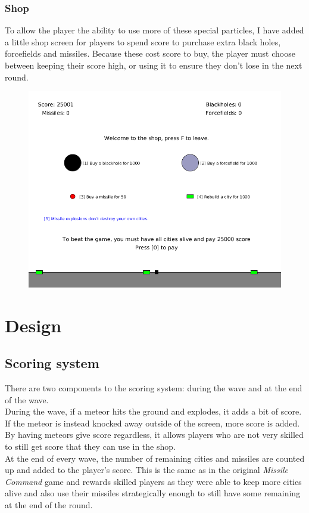 \documentclass{article}
\newcommand{\n}[0]{\\[\baselineskip]}
\begin{document}
\subsubsection*{Shop}
To allow the player the ability to use more of these special particles, I have added a little shop screen for players to spend score to purchase extra black holes, forcefields and missiles. Because these cost score to buy, the player must choose between keeping their score high, or using it to ensure they don't lose in the next round. 
\begin{figure}[H]
\centering
\includegraphics[width=1\textwidth, keepaspectratio]{imgs/Shop.png}
\end{figure}


\section{Design}

\subsection{Scoring system}
There are two components to the scoring system: during the wave and at the end of the wave. \n
During the wave, if a meteor hits the ground and explodes, it adds a bit of score. If the meteor is instead knocked away outside of the screen, more score is added. By having meteors give score regardless, it allows players who are not very skilled to still get score that they can use in the shop.
\n
At the end of every wave, the number of remaining cities and missiles are counted up and added to the player's score. This is the same as in the original \textit{Missile Command} game and rewards skilled players as they were able to keep more cities alive and also use their missiles strategically enough to still have some remaining at the end of the round. 
\end{document}
